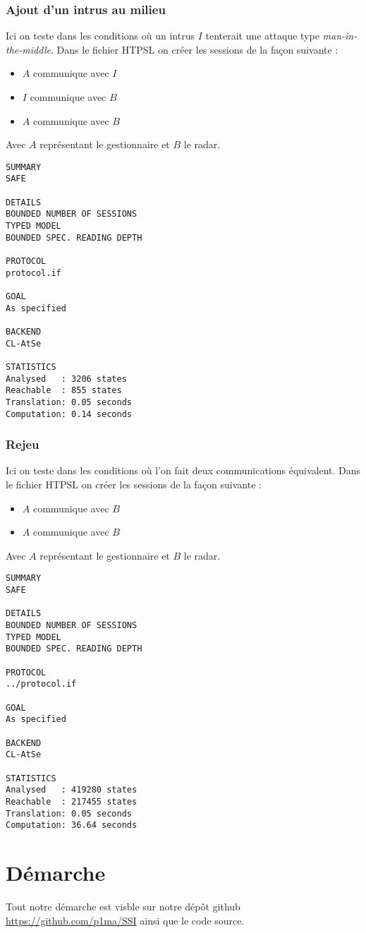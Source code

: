\documentclass[]{scrartcl}
\begin{document}
\subsubsection{Ajout d'un intrus au milieu}

Ici on teste dans les conditions où un intrus $I$ tenterait une attaque type \textit{man-in-the-middle}. Dans le fichier HTPSL on créer les sessions de la façon suivante :
\begin{itemize}
	\item $A$ communique avec $I$
	\item $I$ communique avec $B$
	\item $A$ communique avec $B$
\end{itemize}

Avec $A$ représentant le gestionnaire et $B$ le radar.

\begin{lstlisting}[caption=Résultat d'éxécution - Man-in-the-middle ]
SUMMARY
SAFE

DETAILS
BOUNDED NUMBER OF SESSIONS
TYPED MODEL
BOUNDED SPEC. READING DEPTH

PROTOCOL
protocol.if

GOAL
As specified

BACKEND
CL-AtSe

STATISTICS
Analysed   : 3206 states
Reachable  : 855 states
Translation: 0.05 seconds
Computation: 0.14 seconds
\end{lstlisting}

\subsubsection{Rejeu}

Ici on teste dans les conditions où l'on fait deux communications équivalent. Dans le fichier HTPSL on créer les sessions de la façon suivante :
\begin{itemize}
	\item $A$ communique avec $B$
	\item $A$ communique avec $B$
\end{itemize}

Avec $A$ représentant le gestionnaire et $B$ le radar.

\begin{lstlisting}[caption=Résultat d'éxécution - Rejeu ]
SUMMARY
SAFE

DETAILS
BOUNDED NUMBER OF SESSIONS
TYPED MODEL
BOUNDED SPEC. READING DEPTH

PROTOCOL
../protocol.if

GOAL
As specified

BACKEND
CL-AtSe

STATISTICS
Analysed   : 419280 states
Reachable  : 217455 states
Translation: 0.05 seconds
Computation: 36.64 seconds
\end{lstlisting}

\section{Démarche}

Tout notre démarche est visble sur notre dépôt github  \url{https://github.com/p1ma/SSI} ainsi que le code source.
\end{document}
